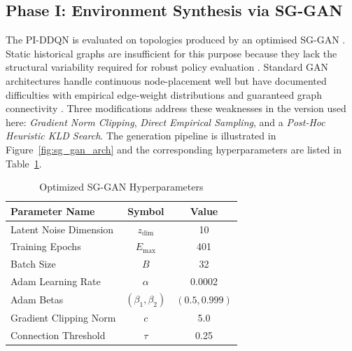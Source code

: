 \documentclass[conference]{IEEEtran}
\begin{document}
\subsection*{\textbf{Phase I: Environment Synthesis via SG-GAN}}
The PI-DDQN is evaluated on topologies produced by an optimised SG-GAN \cite{das2025sggan}. Static historical graphs are insufficient for this purpose because they lack the structural variability required for robust policy evaluation \cite{kaufmann2020}. Standard GAN architectures \cite{goodfellow2014generative} handle continuous node-placement well but have documented difficulties with empirical edge-weight distributions and guaranteed graph connectivity \cite{you2018graphrnn, decao2018molgan}. Three modifications address these weaknesses in the version used here: \textit{Gradient Norm Clipping}, \textit{Direct Empirical Sampling}, and a \textit{Post-Hoc Heuristic KLD Search}. The generation pipeline is illustrated in Figure~\ref{fig:sg_gan_arch} and the corresponding hyperparameters are listed in Table~\ref{tab:gan_params}.

\begin{table}[htbp]
\caption{Optimized SG-GAN Hyperparameters}
\begin{center}
\renewcommand{\arraystretch}{1.4} %
\begin{tabular}{|l|c|c|}
\hline
\textbf{Parameter Name} & \textbf{Symbol} & \textbf{Value} \\
\hline
Latent Noise Dimension & $z_{\text{dim}}$ & 10 \\
Training Epochs & $E_{\max}$ & 401 \\
Batch Size & $B$ & 32 \\
Adam Learning Rate & $\alpha$ & 0.0002 \\
Adam Betas & $(\beta_1, \beta_2)$ & $(0.5, 0.999)$ \\
Gradient Clipping Norm & $c$ & 5.0 \\
Connection Threshold & $\tau$ & 0.25 \\
\hline
\end{tabular}
\label{tab:gan_params}
\end{center}
\end{table}
\end{document}
